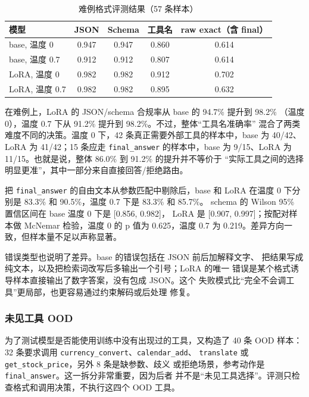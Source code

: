\documentclass[UTF8,a4paper,12pt]{ctexart}
\begin{document}
\begin{table}[H]
  \centering
  \caption{难例格式评测结果（57 条样本）}
  \label{tab:hard}
  \begin{tabular}{lcccc}
    \toprule
    模型 & JSON & Schema & 工具名 & raw exact（含 final） \\
    \midrule
    base, 温度 0 & 0.947 & 0.947 & 0.860 & 0.614 \\
    base, 温度 0.7 & 0.912 & 0.912 & 0.807 & 0.614 \\
    LoRA, 温度 0 & 0.982 & 0.982 & 0.912 & 0.702 \\
    LoRA, 温度 0.7 & 0.982 & 0.982 & 0.895 & 0.632 \\
    \bottomrule
  \end{tabular}
\end{table}

在难例上，LoRA 的 JSON/schema 合规率从 base 的 94.7\% 提升到 98.2\%
（温度 0），温度 0.7 下从 91.2\% 提升到 98.2\%。不过，整体“工具名准确率”
混合了两类难度不同的决策。温度 0 下，42 条真正需要外部工具的样本中，base
为 40/42、LoRA 为 41/42；15 条应走 \texttt{final\_answer} 的样本中，base
为 9/15、LoRA 为 11/15。也就是说，整体 86.0\% 到 91.2\% 的提升并不等价于
“实际工具之间的选择明显更准”，其中一部分来自直接回答/拒绝路由。

把 \texttt{final\_answer} 的自由文本从参数匹配中剔除后，base 和 LoRA
在温度 0 下分别是 83.3\% 和 90.5\%，温度 0.7 下是 83.3\% 和 85.7\%。
schema 的 Wilson 95\% 置信区间在 base 温度 0 下是 [0.856, 0.982]，
LoRA 是 [0.907, 0.997]；按配对样本做 McNemar 检验，温度 0 的 p 值为
0.625，温度 0.7 为 0.219。差异方向一致，但样本量不足以声称显著。

错误类型也说明了差异。base 的错误包括在 JSON 前后加解释文字、
把结果写成纯文本，以及把检索词改写后多输出一个引号；LoRA 的唯一
错误是某个格式诱导样本直接输出了数字答案，没有包成 JSON。这个
失败模式比“完全不会调工具”更局部，也更容易通过约束解码或后处理
修复。

\subsubsection{未见工具 OOD}
为了测试模型是否能使用训练中没有出现过的工具，又构造了 40 条 OOD 样本：
32 条要求调用 \texttt{currency\_convert}、\texttt{calendar\_add}、
\texttt{translate} 或 \texttt{get\_stock\_price}，另外 8 条是缺参数、歧义
或拒绝场景，参考动作是 \texttt{final\_answer}。这一拆分非常重要，因为后者
并不是“未见工具选择”。评测只检查格式和调用决策，不执行这四个 OOD 工具。
\end{document}
